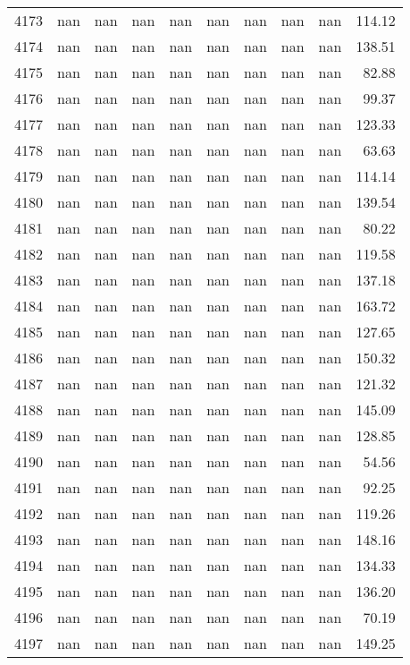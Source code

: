 \begin{tabular}{lrrrrrrrrr}
4173 & nan & nan & nan & nan & nan & nan & nan & nan & 114.12 \\
4174 & nan & nan & nan & nan & nan & nan & nan & nan & 138.51 \\
4175 & nan & nan & nan & nan & nan & nan & nan & nan & 82.88 \\
4176 & nan & nan & nan & nan & nan & nan & nan & nan & 99.37 \\
4177 & nan & nan & nan & nan & nan & nan & nan & nan & 123.33 \\
4178 & nan & nan & nan & nan & nan & nan & nan & nan & 63.63 \\
4179 & nan & nan & nan & nan & nan & nan & nan & nan & 114.14 \\
4180 & nan & nan & nan & nan & nan & nan & nan & nan & 139.54 \\
4181 & nan & nan & nan & nan & nan & nan & nan & nan & 80.22 \\
4182 & nan & nan & nan & nan & nan & nan & nan & nan & 119.58 \\
4183 & nan & nan & nan & nan & nan & nan & nan & nan & 137.18 \\
4184 & nan & nan & nan & nan & nan & nan & nan & nan & 163.72 \\
4185 & nan & nan & nan & nan & nan & nan & nan & nan & 127.65 \\
4186 & nan & nan & nan & nan & nan & nan & nan & nan & 150.32 \\
4187 & nan & nan & nan & nan & nan & nan & nan & nan & 121.32 \\
4188 & nan & nan & nan & nan & nan & nan & nan & nan & 145.09 \\
4189 & nan & nan & nan & nan & nan & nan & nan & nan & 128.85 \\
4190 & nan & nan & nan & nan & nan & nan & nan & nan & 54.56 \\
4191 & nan & nan & nan & nan & nan & nan & nan & nan & 92.25 \\
4192 & nan & nan & nan & nan & nan & nan & nan & nan & 119.26 \\
4193 & nan & nan & nan & nan & nan & nan & nan & nan & 148.16 \\
4194 & nan & nan & nan & nan & nan & nan & nan & nan & 134.33 \\
4195 & nan & nan & nan & nan & nan & nan & nan & nan & 136.20 \\
4196 & nan & nan & nan & nan & nan & nan & nan & nan & 70.19 \\
4197 & nan & nan & nan & nan & nan & nan & nan & nan & 149.25 \\

\end{tabular}

